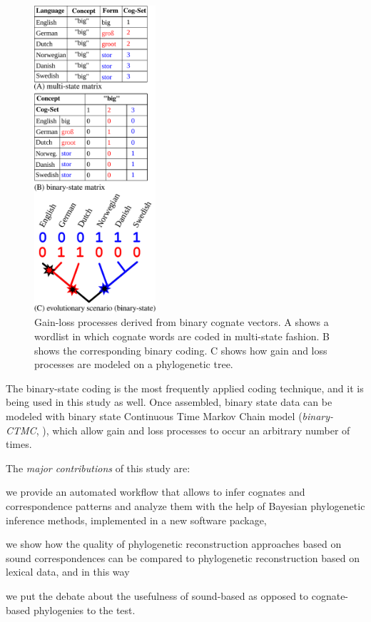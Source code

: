 \documentclass[10pt, a4paper]{article}
\begin{document}
\begin{figure}[tb!]
    \centering
    \includegraphics[width=0.4\textwidth]{figures/figure-1.pdf}
    \caption{Gain-loss processes derived from binary cognate vectors. A shows a wordlist in which
    cognate words are coded in multi-state fashion. B shows the corresponding binary coding. C shows
    how gain and loss processes are modeled on a phylogenetic tree.}\label{fig:1}
\end{figure}


The binary-state coding is the most frequently applied coding technique, and it is being used in this study as well. Once assembled, binary state data can be modeled with binary state Continuous Time Markov Chain model (\emph{binary-CTMC}, \citealt{bouckaert2012mapping}), which allow gain and loss processes to occur an arbitrary number of times. 

The \textit{major contributions} of this study are:
\begin{inparaenum}[(1)]
\item we 
provide an automated workflow that 
allows
to infer cognates and correspondence patterns and analyze them with
the help of Bayesian phylogenetic inference methods, implemented in a new software package,

\item we show how the quality of phylogenetic reconstruction approaches based on sound correspondences can be compared to phylogenetic reconstruction based on lexical data, and in this way
\item we put the debate about the usefulness of sound-based as opposed to cognate-based phylogenies to the test.
\end{inparaenum}
\end{document}
